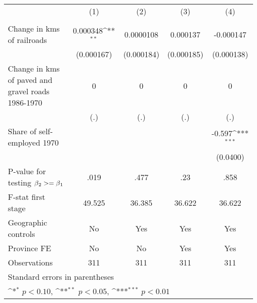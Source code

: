 {
\def\sym#1{\ifmmode^{#1}\else\(^{#1}\)\fi}
\begin{tabular}{l*{4}{c}}
\hline\hline
                &\multicolumn{1}{c}{(1)}&\multicolumn{1}{c}{(2)}&\multicolumn{1}{c}{(3)}&\multicolumn{1}{c}{(4)}\\
                &\multicolumn{1}{c}{}&\multicolumn{1}{c}{}&\multicolumn{1}{c}{}&\multicolumn{1}{c}{}\\
\hline
Change in kms of railroads& 0.000348\sym{**} &0.0000108         & 0.000137         &-0.000147         \\
                &(0.000167)         &(0.000184)         &(0.000185)         &(0.000138)         \\
[1em]
Change in kms of paved and gravel roads 1986-1970&        0         &        0         &        0         &        0         \\
                &      (.)         &      (.)         &      (.)         &      (.)         \\
[1em]
Share of self-employed 1970&                  &                  &                  &   -0.597\sym{***}\\
                &                  &                  &                  & (0.0400)         \\
\hline
P-value for testing $\beta\\_2 >= \beta\\_1$&     .019         &     .477         &      .23         &     .858         \\
F-stat first stage&   49.525         &   36.385         &   36.622         &   36.622         \\
Geographic controls&       No         &      Yes         &      Yes         &      Yes         \\
Province FE     &       No         &       No         &      Yes         &      Yes         \\
Observations    &      311         &      311         &      311         &      311         \\
\hline\hline
\multicolumn{5}{l}{\footnotesize Standard errors in parentheses}\\
\multicolumn{5}{l}{\footnotesize \sym{*} \(p<0.10\), \sym{**} \(p<0.05\), \sym{***} \(p<0.01\)}\\
\end{tabular}
}
